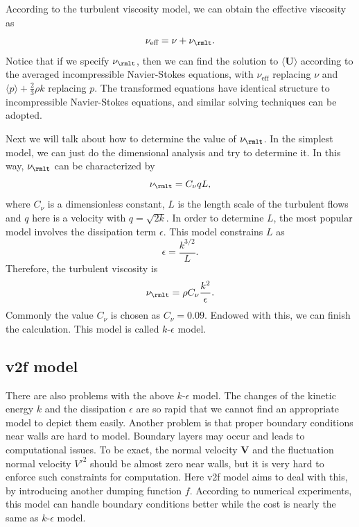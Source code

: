 \documentclass[english, nochinese]{pkupaper}
\begin{document}
According to the turbulent viscosity model, we can obtain the effective viscosity as
\begin{equation}
\nu_{\text{eff}} = \nu + \nu_{\rmlt}.
\end{equation}
Notice that if we specify $\nu_{\rmlt}$, then we can find the solution to $\langle\mathbf{U}\rangle$ according to the averaged incompressible Navier-Stokes equations, with $\nu_{\text{eff}}$ replacing $\nu$ and $\langle p\rangle + \frac{2}{3}\rho k$ replacing $p$. The transformed equations have identical structure to incompressible Navier-Stokes equations, and similar solving techniques can be adopted.

Next we will talk about how to determine the value of $\nu_{\rmlt}$. In the simplest model, we can just do the dimensional analysis and try to determine it. In this way, $\nu_{\rmlt}$ can be characterized by
\begin{equation}
\nu_{\rmlt} = C_{\nu} qL,
\end{equation}
where $C_{\nu}$ is a dimensionless constant, $L$ is the length scale of the turbulent flows and $q$ here is a velocity with $q = \sqrt{2k}$. In order to determine $L$, the most popular model involves the dissipation term $\epsilon$. This model constrains $L$ as 
\begin{equation}
\epsilon = \frac{k^{3/2}}{L}.
\end{equation}
Therefore, the turbulent viscosity is 
\begin{equation}
\nu_{\rmlt} = \rho C_{\nu} \frac{k^2}{\epsilon}.
\end{equation}  
Commonly the value $C_{\nu}$ is chosen as $C_{\nu} = 0.09$. Endowed with this, we can finish the calculation. This model is called $k$-$\epsilon$ model.

\subsection{v2f model}

There are also problems with the above $k$-$\epsilon$ model. The changes of the kinetic energy $k$ and the dissipation $\epsilon$ are so rapid that we cannot find an appropriate model to depict them easily. Another problem is that proper boundary conditions near walls are hard to model. Boundary layers may occur and leads to computational issues. To be exact, the normal velocity $\mathbf{V}$ and the fluctuation normal velocity $V'^2$ should be almost zero near walls, but it is very hard to enforce such constraints for computation. Here v2f model aims to deal with this, by introducing another dumping function $f$. According to numerical experiments, this model can handle boundary conditions better while the cost is nearly the same as $k$-$\epsilon$ model.
\end{document}
